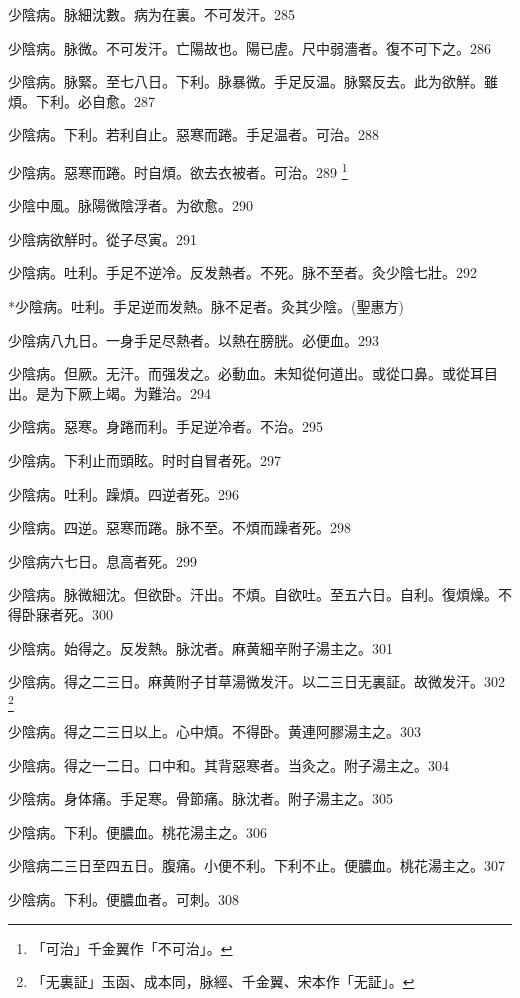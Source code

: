 \documentclass[12pt,twoside,UTF8,b5paper]{ctexbook}
\begin{document}
少陰病。脉細沈數。病为在裏。不可发汗。285

少陰病。脉微。不可发汗。亡陽故也。陽已虗。尺中弱濇者。復不可下之。286

少陰病。脉緊。至七八日。下利。脉暴微。手足反温。脉緊反去。此为欲觧。雖煩。下利。必自愈。287

少陰病。下利。若利自止。惡寒而踡。手足温者。可治。288

少陰病。惡寒而踡。时自煩。欲去衣被者。可治。289
	\footnote{「可治」千金翼作「不可治」。}

少陰中風。脉陽微陰浮者。为欲愈。290

少陰病欲觧时。從子尽寅。291

少陰病。吐利。手足不逆{冷}。反发熱者。不死。脉不至者。灸少陰七壯。292

*少陰病。吐利。手足逆而发熱。脉不足者。灸其少陰。(聖惠方)

少陰病八九日。一身手足尽熱者。以熱在膀胱。必便血。293

少陰病。但厥。无汗。而强发之。必動血。未知從何道出。或從口鼻。或從{耳}目出。是为下厥上竭。为難治。294

少陰病。惡寒。身踡而利。手足逆{冷}者。不治。295

少陰病。下利止而頭眩。时时自冒者死。297

少陰病。吐利。躁煩。四逆者死。296

少陰病。四逆。惡寒而踡。脉不至。不煩而躁者死。298

少陰病六七日。息高者死。299

少陰病。脉微細沈。但欲卧。汗出。不煩。自欲吐。{至}五六日。自利。復煩燥。不得卧寐者死。300

少陰病。始得之。反发熱。脉沈者。麻黄細辛附子湯主之。301

少陰病。得之二三日。麻黄附子甘草湯微发汗。以二三日无{裏}証。故微发汗。302
	\footnote{「无裏証」玉函、成本同，脉經、千金翼、宋本作「无証」。}

少陰病。得之二三日以上。心中煩。不得卧。黄連阿膠湯主之。303

少陰病。得之一二日。口中和。其背惡寒者。当灸之。附子湯主之。304

少陰病。身体痛。手足寒。骨節痛。脉沈者。附子湯主之。305

少陰病。下利。便膿血。桃花湯主之。306

少陰病二三日至四五日。腹痛。小便不利。下利不止。便膿血。桃花湯主之。307

少陰病。下利。便膿血者。可刺。308
\end{document}
